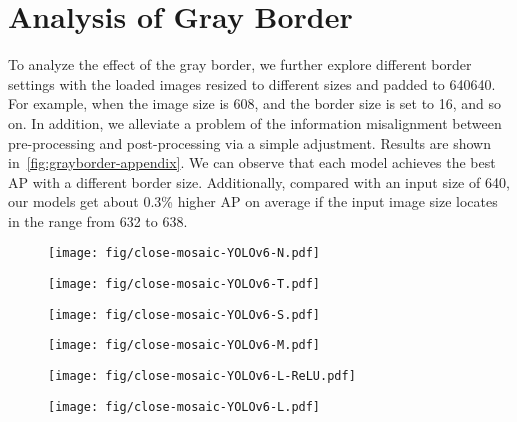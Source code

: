 \documentclass[10pt,twocolumn,letterpaper]{article}
\begin{document}
\section{Analysis of Gray Border}\label{app:gray-border}
To analyze the effect of the gray border, we further explore different border settings with the loaded images resized to different sizes and padded to 640640. For example, when the image size is 608, and the border size is set to 16, and so on. In addition, we alleviate a problem of the information misalignment between pre-processing and post-processing via a simple adjustment. Results are shown in~\cref{fig:grayborder-appendix}. We can observe that each model achieves the best AP with a different border size. Additionally, compared with an input size of 640, our models get about 0.3\% higher AP on average if the input image size locates in the range from 632 to 638. 

\begin{figure*}[ht]
  \centering
 \begin{subfigure}{0.3\textwidth}
    \texttt{[image: fig/close-mosaic-YOLOv6-N.pdf]}
 \caption{}
  \end{subfigure}
   \begin{subfigure}{0.3\textwidth}
       \texttt{[image: fig/close-mosaic-YOLOv6-T.pdf]}
       \caption{}
   \end{subfigure}
   \begin{subfigure}{0.3\textwidth}
  \texttt{[image: fig/close-mosaic-YOLOv6-S.pdf]}
  \caption{}
 \end{subfigure}
 \begin{subfigure}{0.3\textwidth}
  \texttt{[image: fig/close-mosaic-YOLOv6-M.pdf]}
  \caption{}
  \end{subfigure}
  \begin{subfigure}{0.3\textwidth}
    \texttt{[image: fig/close-mosaic-YOLOv6-L-ReLU.pdf]}
    \caption{}
    \end{subfigure}
  \begin{subfigure}{0.3\textwidth}
    \texttt{[image: fig/close-mosaic-YOLOv6-L.pdf]}
    \caption{}
    \end{subfigure}
  \caption{Analysis of the gray border problem.}
  \label{fig:grayborder-appendix}
\end{figure*}
\end{document}
